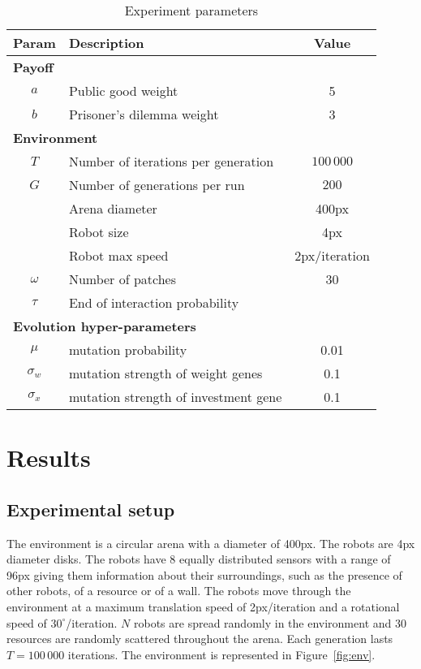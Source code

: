 \documentclass[letterpaper]{article}
\begin{document}
\begin{table}
    \centering
    \begin{tabular}{clc}
        \hline
        \textbf{Param} & \textbf{Description}  & \textbf{Value} \\
        \hline
        \multicolumn{3}{l}{\textbf{Payoff}} \\
        $a$ & Public good weight & 5 \\
        $b$ & Prisoner's dilemma weight & 3 \\
        \multicolumn{3}{l}{\textbf{Environment}} \\
        $T$ & Number of iterations per generation & $100\,000$ \\
        $G$ & Number of generations per run & $200$ \\
        & Arena diameter & 400px \\
        & Robot size & 4px \\
        & Robot max speed & 2px/iteration \\
        $\omega$ & Number of patches & 30 \\
        $\tau$ & End of interaction probability & \\
        \multicolumn{3}{l}{\textbf{Evolution hyper-parameters}} \\
        $\mu$ & mutation probability & 0.01 \\
        $\sigma_w$ & mutation strength of weight genes & 0.1 \\
        $\sigma_x$ & mutation strength of investment gene& 0.1 \\
        \hline
    \end{tabular}
    \caption{Experiment parameters}
    \label{tab:env_params}
\end{table}

\section{Results}

\subsection{Experimental setup}

The environment is a circular arena with a diameter of 400px. The robots are 4px diameter disks. The robots have 8 equally distributed sensors with a range of 96px giving them information about their surroundings, such as the presence of other robots, of a resource or of a wall. The robots move through the environment at a maximum translation speed of 2px/iteration and a rotational speed of $30^\circ$/iteration. $N$ robots are spread randomly in the environment and 30 resources are randomly scattered throughout the arena. Each generation lasts $T = 100\,000$ iterations. The environment is represented in Figure~\ref{fig:env}.
\end{document}
